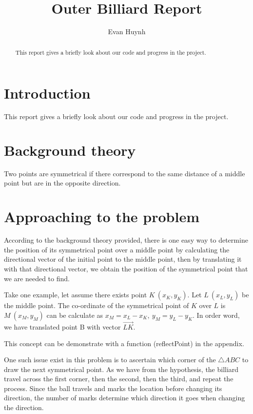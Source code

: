 \documentclass[11pt, a4paper]{article}
\begin{document}
\title{Outer Billiard Report}
\author{Evan Huynh}
\maketitle



\begin{abstract}
	This report gives a briefly look about our code and progress in the  project.
\end{abstract}

\tableofcontents

\section{Introduction}
This report gives a briefly look about our code and progress in the  project. 

\section{Background theory}
Two points are symmetrical if there correspond to the same distance of a middle point but are in the opposite direction. 

\section{Approaching to the problem}
According to the background theory provided, there is one easy way to determine the position of its symmetrical point over a middle point by calculating the directional vector of the initial point to the middle point, then by translating it with that directional vector, we obtain the position of the symmetrical point that we are needed to find.

Take one example, let assume there exists point \(K \ (x_K, y_K)\). Let \(L\ (x_L, y_L)\) be the middle point. The co-ordinate of the symmetrical point of \(K\) over \(L\) is \(M \ (x_M, y_M) \) can be calculate as \(x_M = x_L - x_K, \ y_M = y_L - y_K\). In order word, we have translated point B with vector \(\overrightarrow{LK}\).

This concept can be demonstrate with a function (reflectPoint) in the appendix.

One such issue exist in this problem is to ascertain which corner of the \(\triangle ABC\) to draw the next symmetrical point. As we have from the hypothesis, the billiard travel across the first corner, then the second, then the third, and repeat the process. Since the ball travels and marks the location before changing its direction, the number of marks determine which direction it goes when changing the direction.
\end{document}
